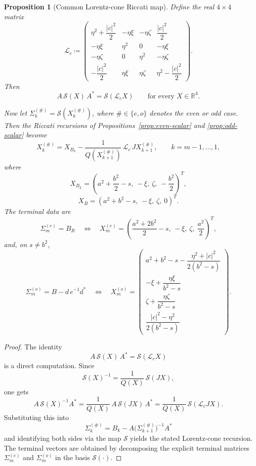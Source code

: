 \documentclass[11pt]{article}
\newtheorem{proposition}[lemma]{Proposition}
\newcommand{\R}{\mathbb R}
\begin{document}
\begin{proposition}[Common Lorentz-cone Riccati map]\label{prop:lorentz}
Define the real \(4\times 4\) matrix
\[
\mathcal L_c\coloneqq
\begin{pmatrix}
\eta^2+\dfrac{|c|^2}{2} & -\eta \xi & -\eta \zeta & \dfrac{|c|^2}{2}\\[1.2ex]
-\eta \xi & \eta^2 & 0 & -\eta \xi\\[1.2ex]
-\eta \zeta & 0 & \eta^2 & -\eta \zeta\\[1.2ex]
-\dfrac{|c|^2}{2} & \eta \xi & \eta \zeta & \eta^2-\dfrac{|c|^2}{2}
\end{pmatrix}.
\]
Then
\[
A\,\mathscr S(X)\,A^*=\mathscr S(\mathcal L_c X)
\qquad\text{for every }X\in\R^4.
\]

Now let \(\Sigma_k^{(\#)}=\mathscr S(X_k^{(\#)})\), where \(\#\in\{e,o\}\) denotes the even or odd case.
Then the Riccati recursions of Propositions~\ref{prop:even-scalar} and \ref{prop:odd-scalar}
become
\[
X_k^{(\#)}
=
X_{B_k}-\frac{1}{Q(X_{k+1}^{(\#)})}\,\mathcal L_c\,JX_{k+1}^{(\#)},
\qquad
k=m-1,\dots,1,
\]
where
\[
X_{B_L}=
\left(
a^2+\frac{b^2}{2}-s,\ -\xi,\ \zeta,\ -\frac{b^2}{2}
\right)^T,
\]
\[
X_B=
\left(
a^2+b^2-s,\ -\xi,\ \zeta,\ 0
\right)^T.
\]
The terminal data are
\[
\Sigma_m^{(e)}=B_R
\quad\Longleftrightarrow\quad
X_m^{(e)}=
\left(
\frac{a^2+2b^2}{2}-s,\ -\xi,\ \zeta,\ \frac{a^2}{2}
\right)^T,
\]
and, on \(s\neq b^2\),
\[
\Sigma_m^{(o)}=B-d\,e^{-1}d^*
\quad\Longleftrightarrow\quad
X_m^{(o)}=
\begin{pmatrix}
a^2+b^2-s-\dfrac{\eta^2+|c|^2}{2(b^2-s)}\\[0.6ex]
-\xi+\dfrac{\eta\xi}{b^2-s}\\[0.6ex]
\zeta+\dfrac{\eta\zeta}{b^2-s}\\[0.6ex]
\dfrac{|c|^2-\eta^2}{2(b^2-s)}
\end{pmatrix}.
\]
\end{proposition}

\begin{proof}
The identity
\[
A\,\mathscr S(X)\,A^*=\mathscr S(\mathcal L_c X)
\]
is a direct computation. Since
\[
\mathscr S(X)^{-1}=\frac{1}{Q(X)}\,\mathscr S(JX),
\]
one gets
\[
A\,\mathscr S(X)^{-1}A^*
=
\frac{1}{Q(X)}\,A\,\mathscr S(JX)\,A^*
=
\frac{1}{Q(X)}\,\mathscr S(\mathcal L_c JX).
\]
Substituting this into
\[
\Sigma_k^{(\#)}=B_k-A\bigl(\Sigma_{k+1}^{(\#)}\bigr)^{-1}A^*
\]
and identifying both sides via the map \(\mathscr S\) yields the stated Lorentz-cone recursion.
The terminal vectors are obtained by decomposing the explicit terminal matrices
\(\Sigma_m^{(e)}\) and \(\Sigma_m^{(o)}\) in the basis \(\mathscr S(\cdot)\).
\end{proof}
\end{document}
